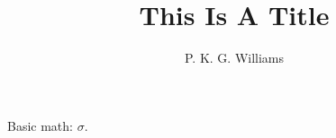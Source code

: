 \documentclass{article}
\title{This Is A Title}
\author{P. K. G. Williams}
\begin{document}
Basic math: $\sigma$.
\end{document}
